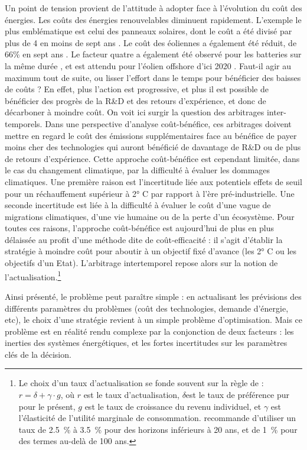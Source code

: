 Un point de tension provient de l’attitude à adopter face à l’évolution du coût des énergies. Les coûts des énergies renouvelables diminuent rapidement. L’exemple le plus emblématique est celui des panneaux solaires, dont le coût a été divisé par plus de 4 en moins de sept ans \citep{Lazard2016}. Le coût des éoliennes a également été réduit, de 66\% en sept ans \citep{Lazard2016}. Le facteur quatre a également été observé pour les batteries sur la même durée \citep{McKinsey2017EV}, et est attendu pour l’éolien offshore d’ici 2020 \citep{McKinsey2017Wind}. Faut-il agir au maximum tout de suite, ou lisser l’effort dans le temps pour bénéficier des baisses de coûts ? En effet, plus l’action est progressive, et plus il est possible de bénéficier des progrès de la R\&D et des retours d’expérience, et donc de décarboner à moindre coût.
On voit ici surgir la question des arbitrages inter-temporels. Dans une perspective d’analyse coût-bénéfice, ces arbitrages doivent mettre en regard le coût des émissions supplémentaires face au bénéfice de payer moins cher des technologies qui auront bénéficié de davantage de R\&D ou de plus de retours d’expérience. Cette approche coût-bénéfice est cependant limitée, dans le cas du changement climatique, par la difficulté à évaluer les dommages climatiques. Une première raison est l’incertitude liée aux potentiels effets de seuil pour un réchauffement supérieur à 2° C par rapport à l'ère pré-industrielle. Une seconde incertitude est liée à la difficulté à évaluer le coût d’une vague de migrations climatiques, d’une vie humaine ou de la perte d’un écosystème. 
Pour toutes ces raisons, l’approche coût-bénéfice est aujourd’hui de plus en plus délaissée au profit d’une méthode dite de coût-efficacité : il s’agit d’établir la stratégie à moindre coût pour aboutir à un objectif fixé d’avance (les 2° C ou les objectifs d’un Etat). L’arbitrage intertemporel repose alors sur la notion de l’actualisation.\footnote{Le choix d’un taux d’actualisation se fonde souvent sur la règle de \citet{Ramsey1928} : $r = \delta + \gamma \cdot g$,
où $r$ est le taux d’actualisation, $\delta$est le taux de préférence pur pour le présent, $g$ est le taux de croissance du revenu individuel, et $\gamma$ est l’élasticité de l’utilité marginale de consommation. \citet{Gollier2011} recommande d’utiliser un taux de 2.5~\% à 3.5~\% pour des horizons inférieurs à 20 ans, et de 1~\% pour des termes au-delà de 100 ans. 
} 

Ainsi présenté, le problème peut paraître simple : en actualisant les prévisions des différents paramètres du problèmes (coût des technologies, demande d’énergie, etc), le choix d’une stratégie revient à un simple problème d’optimisation. 
Mais ce problème est en réalité rendu complexe par la conjonction de deux facteurs : les inerties des systèmes énergétiques, et les fortes incertitudes sur les paramètres clés de la décision.

